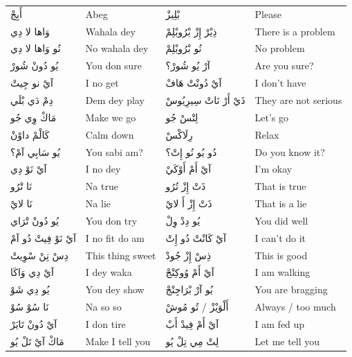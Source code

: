 \documentclass[12pt]{article}
\begin{document}
\begin{longtable}{A p{3.2cm} A p{3.2cm}}
أَبِجْ & Abeg & بْلِيزْ & Please \\
وَاها لا دِي & Wahala dey & ذِيْرْ إِزْ بْرُوبْلِمْ & There is a problem \\
نُو وَاها لا دِي & No wahala dey & نُو بْرُوبْلِمْ & No problem \\
يُو دُونْ شُورْ & You don sure & آرْ يُو شُورْ؟ & Are you sure? \\
آيْ نو جِيتْ & I no get & آيْ دُونْتْ هَافْ & I don’t have \\
دِمْ دَي بْلَي & Dem dey play & ذَيْ أَرْ نَاتْ سِيرِيُوسْ & They are not serious \\
مَاكْ وِي جُو & Make we go & لِتْسْ جُو & Let’s go \\
كَالْمْ داوْنْ & Calm down & رِلَاكْسْ & Relax \\
يُو سَابِي آمْ؟ & You sabi am? & دُو يُو نُو إِتْ؟ & Do you know it? \\
آيْ نَوْ دِي & I no dey & آيْ أَمْ أَوْكَيْ & I’m okay \\
نَا تْرُو & Na true & ذَتْ إِزْ تُرُو & That is true \\
نَا لايْ & Na lie & ذَتْ إِزْ أَ لايْ & That is a lie \\
يُو دُونْ تْرَاي & You don try & يُو دِدْ وِلْ & You did well \\
آيْ نَوْ فِيتْ دُو آمْ & I no fit do am & آيْ كَانْتْ دُو إِتْ & I can’t do it \\
دِسْ تِنْ سْوِيتْ & This thing sweet & ذِسْ إِزْ جُودْ & This is good \\
آيْ دِي وَاكَا & I dey waka & آيْ أَمْ وُوكِنْجْ & I am walking \\
يُو دِي شَوْ & You dey show & يُو آرْ بْرَاجِنْجْ & You are bragging \\
نَا سُوْ سُوْ & Na so so & أَلْوَيْزْ / تُو مُوشْ & Always / too much \\
آيْ دُونْ تَايَرْ & I don tire & آيْ أَمْ فِيدْ أَبْ & I am fed up \\
مَاكْ آيْ تَلْ يُو & Make I tell you & لِتْ مِي تِلْ يُو & Let me tell you \\


\end{longtable}
\end{document}
